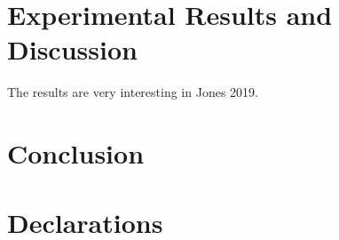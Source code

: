 \documentclass[12pt,twoside]{report}
\begin{document}
\chapter{Experimental Results and Discussion}
The results are very interesting in Jones 2019.

\chapter{Conclusion}





\chapter*{Declarations}
\end{document}
